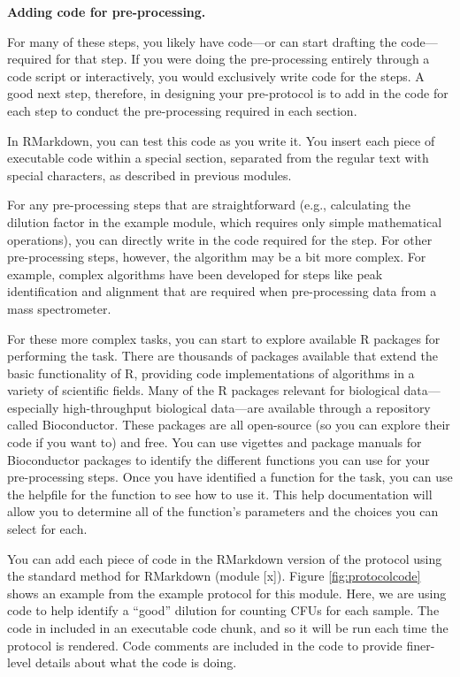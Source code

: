 \documentclass[]{tufte-book}
\begin{document}
\textbf{Adding code for pre-processing.}

For many of these steps, you likely have code---or can start drafting the
code---required for that step. If you were doing the pre-processing entirely
through a code script or interactively, you would exclusively write code for the
steps. A good next step, therefore, in designing your pre-protocol is to add in
the code for each step to conduct the pre-processing required in each section.

In RMarkdown, you can test this code as you write it. You insert each piece
of executable code within a special section, separated from the regular
text with special characters, as described in previous modules.

For any pre-processing steps that are straightforward (e.g., calculating the
dilution factor in the example module, which requires only simple mathematical
operations), you can directly write in the code required for the step.
For other pre-processing steps, however, the algorithm may be a bit more
complex. For example, complex algorithms have been developed for steps like
peak identification and alignment that are required when
pre-processing data from a mass spectrometer.

For these more complex tasks, you can start to explore available R packages for
performing the task. There are thousands of packages available that extend the
basic functionality of R, providing code implementations of algorithms in a
variety of scientific fields. Many of the R packages relevant for biological
data---especially high-throughput biological data---are available through a
repository called Bioconductor. These packages are all open-source (so you can
explore their code if you want to) and free. You can use vigettes and package
manuals for Bioconductor packages to identify the different functions you can
use for your pre-processing steps. Once you have identified a function for the
task, you can use the helpfile for the function to see how to use it. This help
documentation will allow you to determine all of the function's parameters and
the choices you can select for each.

You can add each piece of code in the RMarkdown version of the protocol using
the standard method for RMarkdown (module {[}x{]}). Figure \ref{fig:protocolcode}
shows an example from the example protocol for this module. Here, we are using
code to help identify a ``good'' dilution for counting CFUs for each sample. The
code in included in an executable code chunk, and so it will be run each time
the protocol is rendered. Code comments are included in the code to provide
finer-level details about what the code is doing.
\end{document}
